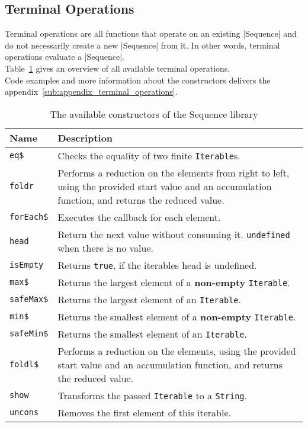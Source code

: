 
\subsection{Terminal Operations} %
\label{sub:api_Terminal Operations}
Terminal operations are all functions that operate on an existing |Sequence|
and do not necessarily create a new |Sequence| from it. In other words,
terminal operations evaluate a |Sequence|.\\ 
Table~\ref{tab:api_term_ops} gives an overview of all available terminal
operations.\\
Code examples and more information about the constructors delivers the
appendix~\ref{sub:appendix_terminal_operations}.

\begin{table}[H]
  \centering
  \begin{tabularx}{\textwidth}{| l | X |} \hline
    \textbf{Name} & \textbf{Description} \\ \hline
    \texttt{eq\$} & Checks the equality of two finite \texttt{Iterable}s. \\ \hline 
    \texttt{foldr} & Performs a reduction on the elements from right to left, using the provided start value and an accumulation function, and returns the reduced value. \\ \hline 
    \texttt{forEach\$} & Executes the callback for each element. \\ \hline 
    \texttt{head} & Return the next value without consuming it. \texttt{undefined} when there is no value. \\ \hline 
    \texttt{isEmpty} & Returns \texttt{true}, if the iterables head is undefined. \\ \hline 
    \texttt{max\$} & Returns the largest element of a \textbf{non-empty} \texttt{Iterable}. \\ \hline 
    \texttt{safeMax\$} & Returns the largest element of an \texttt{Iterable}. \\ \hline 
    \texttt{min\$} & Returns the smallest element of a \textbf{non-empty} \texttt{Iterable}. \\ \hline 
    \texttt{safeMin\$} & Returns the smallest element of an \texttt{Iterable}. \\ \hline 
    \texttt{foldl\$} & Performs a reduction on the elements, using the provided start value and an accumulation function, and returns the reduced value. \\ \hline 
    \texttt{show} & Transforms the passed \texttt{Iterable} to a \texttt{String}. \\ \hline 
    \texttt{uncons} & Removes the first element of this iterable. \\ \hline 
  \end{tabularx}
  \caption{The available constructors of the Sequence library}
  \label{tab:api_term_ops}
\end{table}
